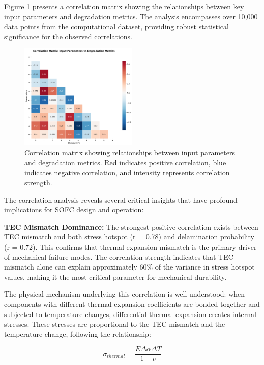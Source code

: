 \documentclass[conference]{IEEEtran}
\begin{document}
Figure \ref{fig:correlation_matrix} presents a correlation matrix showing the relationships between key input parameters and degradation metrics. The analysis encompasses over 10,000 data points from the computational dataset, providing robust statistical significance for the observed correlations.

\begin{figure}[htbp]
\centering
\includegraphics[width=0.5\textwidth]{correlation_matrix.png}
\caption{Correlation matrix showing relationships between input parameters and degradation metrics. Red indicates positive correlation, blue indicates negative correlation, and intensity represents correlation strength.}
\label{fig:correlation_matrix}
\end{figure}

The correlation analysis reveals several critical insights that have profound implications for SOFC design and operation:

\textbf{TEC Mismatch Dominance:} The strongest positive correlation exists between TEC mismatch and both stress hotspot (r = 0.78) and delamination probability (r = 0.72). This confirms that thermal expansion mismatch is the primary driver of mechanical failure modes. The correlation strength indicates that TEC mismatch alone can explain approximately 60\% of the variance in stress hotspot values, making it the most critical parameter for mechanical durability.

The physical mechanism underlying this correlation is well understood: when components with different thermal expansion coefficients are bonded together and subjected to temperature changes, differential thermal expansion creates internal stresses. These stresses are proportional to the TEC mismatch and the temperature change, following the relationship:

\begin{equation}
\sigma_{thermal} = \frac{E \Delta \alpha \Delta T}{1-\nu}
\end{equation}
\end{document}
